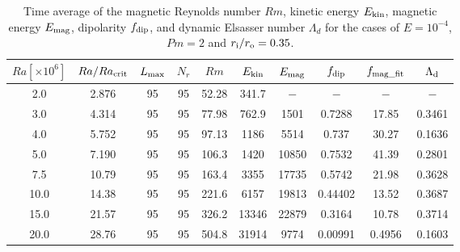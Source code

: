 \begin{table}
\begin{center}
\caption{Time average of the magnetic Reynolds number $Rm$, kinetic energy $E_{\rm kin}$, magnetic energy $E_{\rm mag}$, dipolarity $f_{\rm dip}$, and dynamic Elsasser number $\Lambda_{d}$ for the cases of $E = 10^{-4}$, $Pm = 2$ and $r_{\rm i}/r_{\rm o} = 0.35$.}
\label{table:SummaryEk4_35}
%
\begin{tabular}{cccccccccc}
    \hline
     $Ra[\times 10^6]$  &  $Ra/Ra_{\rm crit}$& 
     $L_{\rm max}$ & $N_{r}$ & $Rm$ 
     & $E_{\rm kin}$  &  $E_{\rm mag}$ & $f_{\rm dip}$ & $f_{\rm mag\_fit}$ & $\Lambda_{\rm d}$\\
    \hline
      2.0 & 2.876 & 95 & 95 & 52.28 & 341.7 & $-$ & $-$ & $-$ & $-$  \\
      3.0 & 4.314 & 95 & 95 & 77.98 & 762.9 & 1501 & 0.7288 & 17.85 & 0.3461 \\
      4.0 & 5.752 & 95 & 95 & 97.13 & 1186 & 5514 & 0.737 & 30.27 & 0.1636 \\
      5.0 & 7.190 & 95 & 95 & 106.3 & 1420 & 10850 & 0.7532 & 41.39 & 0.2801 \\
      7.5 & 10.79 & 95 & 95 & 163.4 & 3355 & 17735 & 0.5742 & 21.98 &  0.3628 \\
      10.0 & 14.38 & 95 & 95 & 221.6 & 6157 & 19813 & 0.44402 & 13.52 &  0.3687 \\
      15.0 & 21.57 & 95 & 95 & 326.2 & 13346 & 22879 & 0.3164 & 10.78 &  0.3714  \\
      20.0 & 28.76 & 95 & 95 & 504.8 & 31914 & 9774 & 0.00991 & 0.4956 & 0.1603 \\
    \hline
  \end{tabular}
 \end{center}
\end{table}